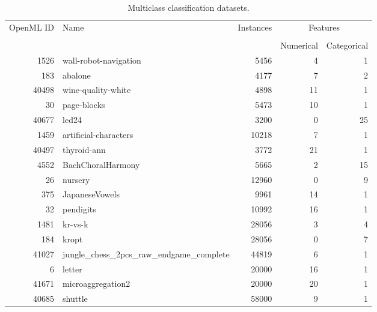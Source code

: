 \begin{table}
\centering
\begin{tabular}{rlrrr}
\toprule
\multirow{2}{*}{OpenML ID} & \multirow{2}{*}{Name} & \multirow{2}{*}{Instances} & \multicolumn{2}{c}{Features} \\ \cline{4-5}
\\[-0.75em]
&                       &                            & Numerical    & Categorical   \\
\midrule
      1526 &                  wall-robot-navigation &         5456 &                4 &                1 \\
       183 &                                abalone &         4177 &                7 &                2 \\
     40498 &                     wine-quality-white &         4898 &               11 &                1 \\
        30 &                            page-blocks &         5473 &               10 &                1 \\
     40677 &                                  led24 &         3200 &                0 &               25 \\
      1459 &                  artificial-characters &        10218 &                7 &                1 \\
     40497 &                            thyroid-ann &         3772 &               21 &                1 \\
      4552 &                      BachChoralHarmony &         5665 &                2 &               15 \\
        26 &                                nursery &        12960 &                0 &                9 \\
       375 &                         JapaneseVowels &         9961 &               14 &                1 \\
        32 &                              pendigits &        10992 &               16 &                1 \\
      1481 &                                kr-vs-k &        28056 &                3 &                4 \\
       184 &                                  kropt &        28056 &                0 &                7 \\
     41027 & jungle\_chess\_2pcs\_raw\_endgame\_complete &        44819 &                6 &                1 \\
         6 &                                 letter &        20000 &               16 &                1 \\
     41671 &                      microaggregation2 &        20000 &               20 &                1 \\
     40685 &                                shuttle &        58000 &                9 &                1 \\
\bottomrule
\end{tabular}
\caption{Multiclass classification datasets.}
\label{tab:multiclass_data}
\end{table}
